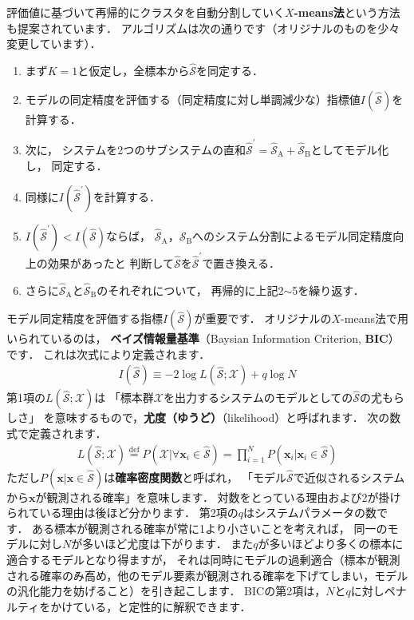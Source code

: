 ﻿\documentclass{jsarticle}
\begin{document}
評価値に基づいて再帰的にクラスタを自動分割していく{\bf $X$-means法}\cite{bib:pelleg2000}という方法も提案されています．
アルゴリズムは次の通りです（オリジナルのものを少々変更しています）．
\begin{screen}
\begin{enumerate}
\setlength{\itemsep}{-.2\baselineskip}
\item{まず$K=1$と仮定し，全標本から$\hat{\mathcal{S}}$を同定する．}
\item{モデルの同定精度を評価する（同定精度に対し単調減少な）指標値$I(\hat{\mathcal{S}})$を計算する．}
\item{次に，
システムを2つのサブシステムの直和$\hat{\mathcal{S}}^{\prime}=\hat{\mathcal{S}}_{\mathrm{A}}+\hat{\mathcal{S}}_{\mathrm{B}}$としてモデル化し，
同定する．}
\item{同様に$I(\hat{\mathcal{S}}^{\prime})$を計算する．}
\item{$I(\hat{\mathcal{S}}^{\prime})<I(\hat{\mathcal{S}})$ならば，
$\hat{\mathcal{S}}_{\mathrm{A}}$，$\hat{\mathcal{S}}_{\mathrm{B}}$へのシステム分割によるモデル同定精度向上の効果があったと
判断して$\hat{\mathcal{S}}$を$\hat{\mathcal{S}}^{\prime}$で置き換える．}
\item{さらに$\hat{\mathcal{S}}_{\mathrm{A}}$と$\hat{\mathcal{S}}_{\mathrm{B}}$のそれぞれについて，
再帰的に上記2$\sim$5を繰り返す．}
\end{enumerate}
\end{screen}
モデル同定精度を評価する指標$I(\hat{\mathcal{S}})$が重要です．
オリジナルの$X$-means法で用いられているのは，
{\bf ベイズ情報量基準}（Baysian Information Criterion, {\bf BIC}）\cite{bib:shwarz1978}です．
これは次式により定義されます．
\begin{align*}
I(\hat{\mathcal{S}})\equiv -2\log L(\hat{\mathcal{S}};\mathcal{X})+q\log N
\end{align*}
第1項の$L(\hat{\mathcal{S}};\mathcal{X})$は
「標本群$\mathcal{X}$を出力するシステムのモデルとしての$\hat{\mathcal{S}}$の尤もらしさ」
を意味するもので，{\bf 尤度（ゆうど）}（likelihood）と呼ばれます．
次の数式で定義されます．
\begin{align*}
L(\hat{\mathcal{S}};\mathcal{X})
\overset{\mathrm{def}}{=}P(\mathcal{X}|\forall\bm{x}_{i}\in\hat{\mathcal{S}})
=\prod_{i=1}^{N}P(\bm{x}_{i}|\bm{x}_{i}\in\hat{\mathcal{S}})
\end{align*}
ただし$P(\bm{x}|\bm{x}\in\hat{\mathcal{S}})$は{\bf 確率密度関数}と呼ばれ，
「モデル$\hat{\mathcal{S}}$で近似されるシステムから$\bm{x}$が観測される確率」を意味します．
対数をとっている理由および2が掛けられている理由は後ほど分かります．
第2項の$q$はシステムパラメータの数です．
ある標本が観測される確率が常に1より小さいことを考えれば，
同一のモデルに対し$N$が多いほど尤度は下がります．
また$q$が多いほどより多くの標本に適合するモデルとなり得ますが，
それは同時にモデルの過剰適合（標本が観測される確率\'{の}\'{み}高め，他のモデル要素が観測される確率を下げてしまい，モデルの汎化能力を妨げること）を引き起こします．
BICの第2項は，$N$と$q$に対しペナルティをかけている，と定性的に解釈できます．
\end{document}
